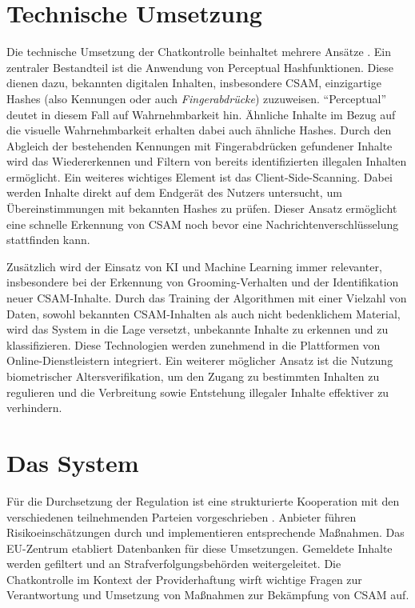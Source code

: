 \documentclass[a4paper]{article}
\begin{document}
\section{Technische Umsetzung}
Die technische Umsetzung der Chatkontrolle beinhaltet mehrere Ansätze \cite{bugs_in_our_pockets}. Ein zentraler Bestandteil ist die Anwendung von Perceptual Hashfunktionen. Diese dienen dazu, bekannten digitalen Inhalten, insbesondere CSAM, einzigartige Hashes (also Kennungen oder auch \textit{Fingerabdrücke}) zuzuweisen. "`Perceptual"' deutet in diesem Fall auf Wahrnehmbarkeit hin. Ähnliche Inhalte im Bezug auf die visuelle Wahrnehmbarkeit erhalten dabei auch ähnliche Hashes. Durch den Abgleich der bestehenden Kennungen mit Fingerabdrücken gefundener Inhalte wird das Wiedererkennen und Filtern von bereits identifizierten illegalen Inhalten ermöglicht. Ein weiteres wichtiges Element ist das Client-Side-Scanning. Dabei werden Inhalte direkt auf dem Endgerät des Nutzers untersucht, um Übereinstimmungen mit bekannten Hashes zu prüfen. Dieser Ansatz ermöglicht eine schnelle Erkennung von CSAM noch bevor eine Nachrichtenverschlüsselung stattfinden kann.

Zusätzlich wird der Einsatz von KI und Machine Learning immer relevanter, insbesondere bei der Erkennung von Grooming-Verhalten und der Identifikation neuer CSAM-Inhalte. Durch das Training der Algorithmen mit einer Vielzahl von Daten, sowohl bekannten CSAM-Inhalten als auch nicht bedenklichem Material, wird das System in die Lage versetzt, unbekannte Inhalte zu erkennen und zu klassifizieren. Diese Technologien werden zunehmend in die Plattformen von Online-Dienstleistern integriert. Ein weiterer möglicher Ansatz ist die Nutzung biometrischer Altersverifikation, um den Zugang zu bestimmten Inhalten zu regulieren und die Verbreitung sowie Entstehung illegaler Inhalte effektiver zu verhindern.

\section{Das System}
Für die Durchsetzung der Regulation ist eine strukturierte Kooperation mit den verschiedenen teilnehmenden Parteien vorgeschrieben \cite{proposal_csam}. Anbieter führen Risikoeinschätzungen durch und implementieren entsprechende Maßnahmen. Das EU-Zentrum \cite{eu_csam} etabliert Datenbanken für diese Umsetzungen. Gemeldete Inhalte werden gefiltert und an Strafverfolgungsbehörden weitergeleitet. Die Chatkontrolle im Kontext der Providerhaftung wirft wichtige Fragen zur Verantwortung und Umsetzung von Maßnahmen zur Bekämpfung von CSAM auf.
\end{document}
